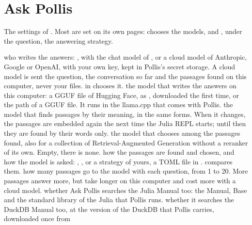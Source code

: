 \section{Ask Pollis}\label{sec:ask}
The settings of . Most are set on its own pages:  chooses the models, and , under the question, the answering strategy.
\begin{itemize}
    who writes the answers: , with the chat model of , or a cloud model
    of Anthropic, Google or OpenAI, with your own key, kept in Pollis's secret storage. A cloud model is sent the
    question, the conversation so far and the passages found on this computer, never your files.  in
     chooses it.
    the model that writes the answers on this computer: a GGUF file of Hugging Face, as
    , downloaded the first time, or the path of a GGUF file. It runs in the
    llama.cpp that comes with Pollis.
    the model that finds passages by their meaning, in the same forms. When it changes, the passages are embedded
    again the next time the Julia REPL starts; until then they are found by their words only.
    the model that chooses among the passages found, also for a collection of Retrieval-Augmented Generation without a
    reranker of its own. Empty, there is none.
    how the passages are found and chosen, and how the model is asked: , , or a strategy
    of yours, a TOML file in .  compares them.
    how many passages go to the model with each question, from 1 to 20. More passages answer more, but take longer on
    this computer and cost more with a cloud model.
    whether Ask Pollis searches the Julia Manual too: the Manual, Base and the standard library of the Julia that
    Pollis runs.
    whether it searches the DuckDB Manual too, at the version of the DuckDB that Pollis carries, downloaded once from

\end{itemize}
